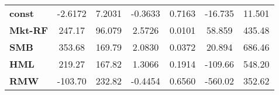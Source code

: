 \begin{center}
\begin{tabular}{lcccccc}
\midrule
\textbf{const}  &      -2.6172       &       7.2031       &     -0.3633     &      0.7163      &      -16.735      &       11.501       \\
\textbf{Mkt-RF} &       247.17       &       96.079       &      2.5726     &      0.0101      &       58.859      &       435.48       \\
\textbf{SMB}    &       353.68       &       169.79       &      2.0830     &      0.0372      &       20.894      &       686.46       \\
\textbf{HML}    &       219.27       &       167.82       &      1.3066     &      0.1914      &      -109.66      &       548.20       \\
\textbf{RMW}    &      -103.70       &       232.82       &     -0.4454     &      0.6560      &      -560.02      &       352.62       \\
\bottomrule
\end{tabular}
\end{center}

